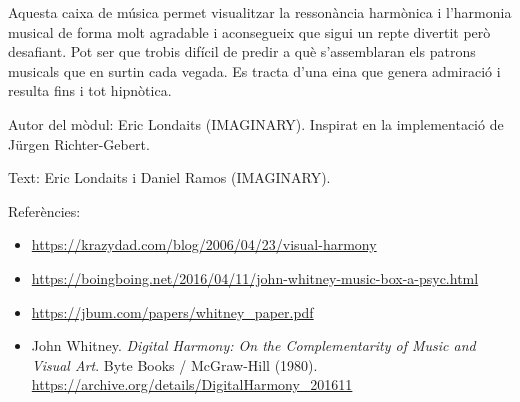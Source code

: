 Aquesta caixa de música permet visualitzar la ressonància harmònica i l'harmonia musical de forma molt agradable i aconsegueix que sigui un repte divertit però desafiant. Pot ser que trobis difícil de predir a què s'assemblaran els patrons musicals que en surtin cada vegada. Es tracta d'una eina que genera admiració i resulta fins i tot hipnòtica.


\begin{sectcredits}
\item[Autor del mòdul:] Eric Londaits (IMAGINARY). Inspirat en la implementació de Jürgen Richter-Gebert.

\item[Text:] Eric Londaits i Daniel Ramos (IMAGINARY).

\item[Referències:] \strut
\noindent \begin{itemize}[leftmargin=*]
\item \url{https://krazydad.com/blog/2006/04/23/visual-harmony}

\item \url{https://boingboing.net/2016/04/11/john-whitney-music-box-a-psyc.html}

\item \url{https://jbum.com/papers/whitney_paper.pdf}

\item John Whitney. \emph{Digital Harmony: On the Complementarity of Music and Visual Art}. Byte Books / McGraw-Hill (1980). \\
\url{https://archive.org/details/DigitalHarmony_201611}

\end{itemize}
\end{sectcredits}
